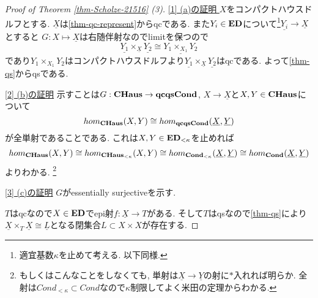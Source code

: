 \documentclass[dvipdfmx,a4paper,11pt]{article}
\theoremstyle{definition}
\begin{document}
\begin{proof}[Proof of Theorem \ref{thm-Scholze-21516} (3)]

\underline{[1] (a)の証明 }
$X$をコンパクトハウスドルフとする.
$\underline{X}$は\ref{thm-qc-represent}からqcである.
また$Y_i \in {\bf ED}$について\footnote{適宜基数$\kappa$を止めて考える. 以下同様.}$\underline{Y_i} \to \underline{X}$とすると
$G : X \mapsto \underline{X}$は右随伴射なのでlimitを保つので
$$
\underline{Y_1} \times_{\underline{X}}\underline{Y_2}
\cong  
\underline{Y_1 \times_{X_1}Y_2}
$$
であり$Y_1 \times_{X_1}Y_2$はコンパクトハウスドルフより$\underline{Y_1} \times_{\underline{X}}\underline{Y_2}$はqcである. よって\ref{thm-qs}からqsである.

\underline{[2] (b)の証明}
示すことは$G : {\bf CHaus} \to {\bf qcqsCond}$, $X \to \underline{X}$と$X,Y \in {\bf CHaus}$について
$$
hom_{\bf CHaus} (X,Y) \cong 
hom_{\bf qcqsCond}(\underline{X}, \underline{Y})
$$
が全単射であることである.
これは$X,Y \in {\bf ED}_{< \kappa}$を止めれば
$$
hom_{\bf CHaus} (X,Y) \cong 
hom_{\bf CHaus_{< \kappa}} (X,Y) \cong
hom_{\bf Cond_{< \kappa}}(\underline{X}, \underline{Y})
\cong hom_{\bf Cond}(\underline{X}, \underline{Y})
$$
よりわかる. \footnote{もしくはこんなことをしなくても, 単射は$\underline{X} \to \underline{Y}$の射に$\ast$入れれば明らか. 全射は$Cond_{< \kappa} \subset Cond$なので$\kappa$制限してよく米田の定理からわかる.}

\underline{[3] (c)の証明}
$G$がessentially surjectiveを示す. 

$T$はqcなので$X \in {\bf ED}$でepi射$f : \underline{X} \to T$がある. %
そして$T$はqsなので\ref{thm-qs}により
$\underline{X} \times_{T} \underline{X} \cong \underline{L}$となる閉集合$L \subset X \times X$が存在する. 
\begin{comment}
$\underline{X} \times_{T} \underline{X}$はqcであり, 
ある$W \in {\bf ED}$とepi射
$W \to \underline{X} \times_{T} \underline{X}$が存在する.


\end{comment}
\end{proof}
\end{document}
